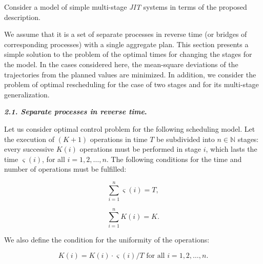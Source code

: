 

Consider a model of simple multi-stage \emph{JIT} systems in terms of the proposed description. 

We assume that it is a set of separate processes in reverse time (or bridges of corresponding processes) with a single aggregate plan. This section presents a simple solution to the problem of the optimal times for changing the stages for the model. In the cases considered here, the mean-square deviations of the trajectories from the planned values are minimized. In addition, we consider the problem of optimal rescheduling for the case of two stages and for its multi-stage generalization.



\smallskip






\textbf{\emph{2.1. Separate processes in reverse time}.}

Let us consider optimal control problem for the following scheduling model. Let the execution of $(K+1)$ operations in time $T$ be subdivided into $n\in \mathbb{N}$ stages: every successive $K(i)$ operations must be performed in stage $i$, which lasts the time $\varsigma(i)$, for all $i=1, 2,  \dotsc, n$. The following conditions for the time and number of operations must be fulfilled:

\begin{equation}\label{eq:sigmaT}

 \sum_{i=1}^{n} \varsigma(i) = T,

\end{equation}

\begin{equation}\label{eq:KforK}

 \sum_{i=1}^{n} K(i) = K.

\end{equation}

We also define the condition for the uniformity of the operations:

\begin{equation}\label{eq:KTforK}

 K(i) = K(i)\cdot\varsigma(i)/T \text{ for all $i=1, 2, \dotsc , n$}.

\end{equation}

